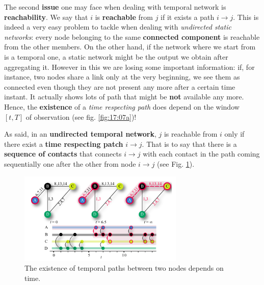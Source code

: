 \documentclass[../main/main.tex]{subfiles}
\begin{document}
The second \textbf{issue} one may face when dealing with temporal network is \textbf{reachability}. We say that $i$ is \textbf{reachable} from $j$ if it exists a path $i\to j$. This is indeed a very easy problem to tackle when dealing with \textit{undirected static networks}: every node belonging to the same \textbf{connected component} is reachable from the other members. On the other hand, if the network where we start from is a temporal one, a static network might be the output we obtain after aggregating it. However in this we are losing some important information: if, for instance, two nodes share a link only at the very beginning, we see them as connected even though they are not present any more after a certain time instant. It actually shows lots of path that might be \textbf{not} available any more. Hence, the \textbf{existence} of a \textit{time respecting path} does depend on the window $[t,T]$ of observation (see fig. \ref{fig:17:07a})!

As said, in an \textbf{undirected temporal network}, $j$ is reachable from $i$ only if there exist a \textbf{time respecting patch} $i \to j$. That is to say that there is a \textbf{sequence of contacts} that connects $i \to j$ with each contact in the path coming sequentially one after the other from node $i\to j$ (see Fig. \ref{fig:17_06}).

\begin{figure}[h!]
\centering
\includegraphics[width=0.7\textwidth]{../lessons/image/17/image06.png}
\caption{\label{fig:17_06} The existence of temporal paths between two nodes depends on time. }
\end{figure}
\end{document}

